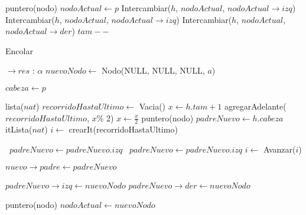 \begin{Algoritmos}
\begin{algorithm}
\begin{algorithmic}[1]
    \State puntero(nodo) $nodoActual \gets p$
          \State Intercambiar($h$, $nodoActual$, $nodoActual \to izq$)
        \Else 
            \State Intercambiar($h$, $nodoActual$, $nodoActual \to izq$)
          \Else
             \State Intercambiar($h$, $nodoActual$, $nodoActual \to der$)
          \EndIf
        \EndIf
      \EndIf
    \EndWhile
   \EndIf
  \State $tam--$
 \EndProcedure
\end{algorithmic}
\end{algorithm}




\begin{algorithm}
\caption{Encolar}
\begin{algorithmic}[1]
   $\to res$ : $\alpha$
  \State $nuevoNodo \gets$ Nodo(NULL, NULL, NULL, $a$)

    \State $cabeza \gets p$
  \Else

    \State lista($nat$) $recorridoHastaUltimo \gets$ Vacia()
    \State $x \gets h.tam+1$
      \State agregarAdelante($recorridoHastaUltimo$, $x$\% 2)
      \State $x \gets \frac{x}{2}$
    \EndWhile
    \State puntero(nodo) $padreNuevo \gets h.cabeza$
    \State itLista($nat$) $i \gets$ crearIt(recorridoHastaUltimo)
    
    \Repeat
       \ $padreNuevo \gets padreNuevo.izq$
      \Else \  $padreNuevo \gets padreNuevo.izq$
      \EndIf
      \State $i \gets$ Avanzar($i$)
    
    \State $nuevo \to padre \gets padreNuevo$

      \State $padreNuevo \to izq \gets nuevoNodo$
    \Else
       \State $padreNuevo \to der \gets nuevoNodo$
    \EndIf

    \State puntero(nodo) $nodoActual \gets nuevoNodo$



\end{algorithmic}
\end{algorithm}
\end{Algoritmos}
